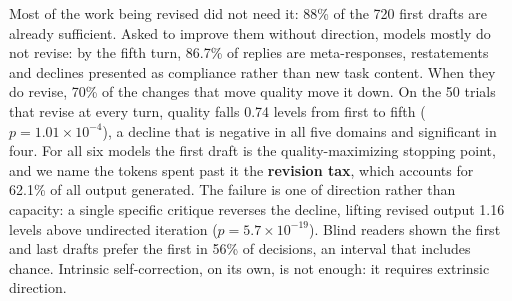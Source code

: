 Most of the work being revised did not need it: 88\% of the 720 first drafts are already
sufficient. Asked to improve them without direction, models mostly do not revise: by the
fifth turn, 86.7\% of replies are meta-responses, restatements and declines presented as
compliance rather than new task content. When they do revise, 70\% of the changes that move
quality move it down. On the 50 trials that revise at every turn, quality falls 0.74 levels
from first to fifth ($p = 1.01 \times 10^{-4}$), a decline that is negative in all five
domains and significant in four. For all six models the first draft is the quality-maximizing stopping point, and we
name the tokens spent past it the \textbf{revision tax}, which accounts for 62.1\% of
all output generated. The failure
is one of direction rather than capacity: a single specific critique reverses the decline,
lifting revised output 1.16 levels above undirected iteration
($p = 5.7 \times 10^{-19}$). Blind readers shown the first and last drafts prefer the first
in 56\% of decisions, an interval that includes chance. Intrinsic self-correction, on its
own, is not enough: it requires extrinsic direction.
